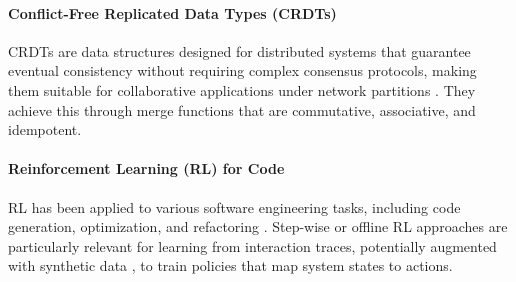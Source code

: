 \documentclass{article}
\begin{document}
\paragraph{Conflict-Free Replicated Data Types (CRDTs)}
CRDTs are data structures designed for distributed systems that guarantee eventual consistency without requiring complex consensus protocols, making them suitable for collaborative applications under network partitions \cite{ref5}. They achieve this through merge functions that are commutative, associative, and idempotent.

\paragraph{Reinforcement Learning (RL) for Code}
RL has been applied to various software engineering tasks, including code generation, optimization, and refactoring \cite{ref25,ref26}. Step-wise or offline RL approaches \cite{ref8,ref9,ref10} are particularly relevant for learning from interaction traces, potentially augmented with synthetic data \cite{ref8}, to train policies that map system states to actions.
\end{document}
